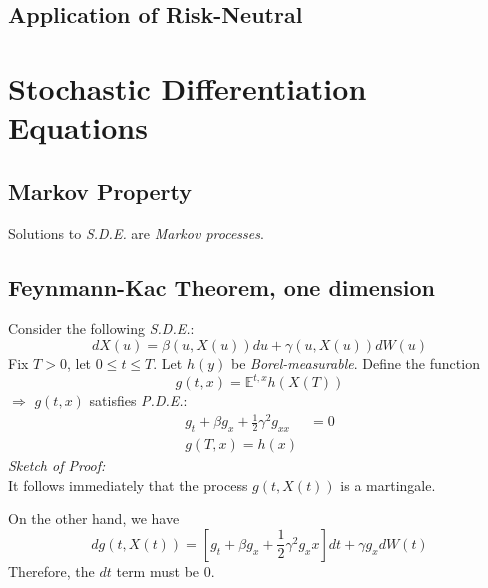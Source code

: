 \documentclass[a4paper, 11pt]{article}
\begin{document}
\subsection{Application of Risk-Neutral}

\section{Stochastic Differentiation Equations}

\subsection{Markov Property}
Solutions to \textit{S.D.E.} are \textit{Markov processes}.

\subsection{Feynmann-Kac Theorem, one dimension}
Consider the following \textit{S.D.E.}:
\begin{equation}
dX(u) = \beta(u, X(u)) du + \gamma(u, X(u)) dW(u)
\end{equation}
Fix $T > 0$, let $0 \leq t \leq T$. Let $h(y)$ be \textit{Borel-measurable}. Define the function
\begin{equation}
g(t, x) = \mathbb{E}^{t, x}h(X(T))
\end{equation}
$\Longrightarrow$ $g(t, x)$ satisfies \textit{P.D.E.}:
\begin{subequations}
\begin{align}
g_t + \beta g_x + \frac{1}{2}\gamma^2 g_{xx} &= 0 \\
g(T, x) = h(x)
\end{align}
\end{subequations}
\textit{Sketch of Proof: }\\
\indent It follows immediately that the process $g(t, X(t))$ is a martingale.\par
On the other hand, we have
\begin{equation}
dg(t, X(t)) = [g_t + \beta g_x + \frac{1}{2}\gamma^2 g_xx]dt + \gamma g_x dW(t)
\end{equation}
Therefore, the $dt$ term must be $0$.
\end{document}

